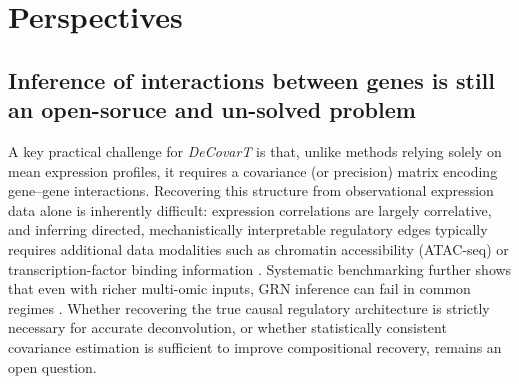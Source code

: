 \documentclass[pdflatex, sn-nature]{sn-jnl}
\theoremstyle{thmstyleone}%
\theoremstyle{thmstyletwo}%
\theoremstyle{thmstylethree}%
\begin{document}
    
    
    \section{Perspectives}
     \subsection{Inference of interactions between genes is still an open-soruce and un-solved problem}

    A key practical challenge for \emph{DeCovarT} is that, unlike methods relying
    solely on mean expression profiles, it requires a covariance (or precision)
    matrix encoding gene--gene interactions.  Recovering this structure from
    observational expression data alone is inherently difficult: expression
    correlations are largely correlative, and inferring directed, mechanistically
    interpretable regulatory edges typically requires additional data modalities
    such as chromatin accessibility (ATAC-seq) or transcription-factor binding
    information \cite{badia-i-mompelGeneRegulatoryNetwork2023,maizelsGeneRegulatoryNetworks2026}.
    Systematic benchmarking further shows that even with richer multi-omic inputs,
    GRN inference can fail in common regimes \cite{nourisaGeneRNIBLivingBenchmark2025}.
    Whether recovering the true causal regulatory architecture is strictly
    necessary for accurate deconvolution, or whether statistically consistent
    covariance estimation is sufficient to improve compositional recovery, remains
    an open question.
\end{document}
